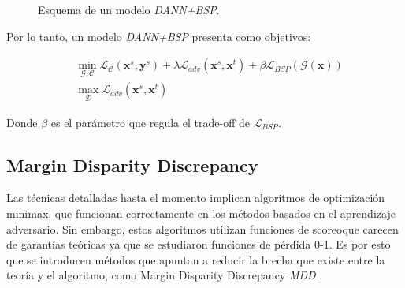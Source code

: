 \begin{figure}[H]

    \caption{Esquema de un modelo {\it DANN+BSP}.}
    \label{fig:bsp-esquema-dann}
\end{figure}

Por lo tanto, un modelo {\it DANN+BSP} presenta como objetivos:

\begin{align}
     & \min_{\mathcal{G},\mathcal{C}} \mathcal{L}_\mathcal{C}(\mathbf{x}^s, \mathbf{y}^s) + \lambda \mathcal{L}_{adv}(\mathbf{x}^s, \mathbf{x}^t) + \beta \mathcal{L}_{BSP}(\mathcal{G}(\mathbf{x})) \\
     & \max_{\mathcal{D}} \mathcal{L}_{adv}(\mathbf{x}^s, \mathbf{x}^t)
    \label{eq:bsp-dann-obejtivo}
\end{align}

Donde $\beta$ es el par\'ametro que regula el trade-off de $\mathcal{L}_{BSP}$.

\subsection{Margin Disparity Discrepancy}

Las t\'ecnicas detalladas hasta el momento implican algoritmos de optimizaci\'on minimax, que funcionan correctamente
en los m\'etodos basados en el aprendizaje adversario. Sin embargo, estos algoritmos utilizan funciones de scoreoque
carecen de garant\'ias te\'oricas ya que se estudiaron funciones de p\'erdida 0-1. Es por esto que se introducen
m\'etodos que apuntan a reducir la brecha que existe entre la teor\'ia y el algoritmo, como Margin Disparity
Discrepancy {\it MDD} \parencite{zhang2019bridging}.

